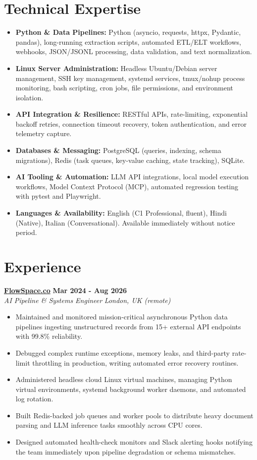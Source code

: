 \documentclass[10pt,a4paper]{article}
\newcommand{\role}[4]{%
  \textbf{#1} \hfill \textbf{#2}\\[1pt]%
  \textit{#3} \hfill \textit{#4}\\[2pt]%
}
\begin{document}
\section{Technical Expertise}
\begin{itemize}
  \item \textbf{Python \& Data Pipelines:} Python (asyncio, requests, httpx, Pydantic, pandas), long-running extraction scripts, automated ETL/ELT workflows, webhooks, JSON/JSONL processing, data validation, and text normalization.
  \item \textbf{Linux Server Administration:} Headless Ubuntu/Debian server management, SSH key management, systemd services, tmux/nohup process monitoring, bash scripting, cron jobs, file permissions, and environment isolation.
  \item \textbf{API Integration \& Resilience:} RESTful APIs, rate-limiting, exponential backoff retries, connection timeout recovery, token authentication, and error telemetry capture.
  \item \textbf{Databases \& Messaging:} PostgreSQL (queries, indexing, schema migrations), Redis (task queues, key-value caching, state tracking), SQLite.
  \item \textbf{AI Tooling \& Automation:} LLM API integrations, local model execution workflows, Model Context Protocol (MCP), automated regression testing with pytest and Playwright.
  \item \textbf{Languages \& Availability:} English (C1 Professional, fluent), Hindi (Native), Italian (Conversational). Available immediately without notice period.
\end{itemize}

\section{Experience}

\role{\href{https://flowspace.co}{FlowSpace.co}}{Mar 2024 - Aug 2026}{AI Pipeline \& Systems Engineer}{London, UK (remote)}
\begin{itemize}
  \item Maintained and monitored mission-critical asynchronous Python data pipelines ingesting unstructured records from 15+ external API endpoints with 99.8\% reliability.
  \item Debugged complex runtime exceptions, memory leaks, and third-party rate-limit throttling in production, writing automated error recovery routines.
  \item Administered headless cloud Linux virtual machines, managing Python virtual environments, systemd background worker daemons, and automated log rotation.
  \item Built Redis-backed job queues and worker pools to distribute heavy document parsing and LLM inference tasks smoothly across CPU cores.
  \item Designed automated health-check monitors and Slack alerting hooks notifying the team immediately upon pipeline degradation or schema mismatches.
\end{itemize}
\end{document}
